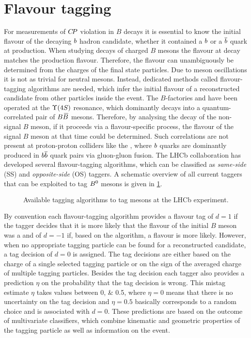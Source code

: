 
\section{Flavour tagging}
\label{sec:detector:tagging}

For measurements of ${C\!P}$ violation in $B$ decays it is essential to know the
initial flavour of the decaying ${b}$ hadron candidate, \ie whether it
contained a ${b}$ or a ${\overline {{b}}}$ quark at production. When studying
decays of charged $B$ mesons the flavour at decay matches the production
flavour. Therefore, the flavour can unambiguously be determined from the
charges of the final state particles. Due to meson oscillations it is not as
trivial for neutral mesons. Instead, dedicated methods called flavour-tagging
algorithms are needed, which infer the initial flavour of a reconstructed
candidate from other particles inside the event. The $B$-factories \babar and
\belle have been operated at the $\FourS$ resonance, which dominantly decays into a
quantum-correlated pair of $B{\kern 0.18em\overline{\kern -0.18em B}{}}$ mesons. Therefore, by analysing the decay
of the non-signal $B$ meson, \eg if it proceeds via a flavour-specific
process, the flavour of the signal $B$ meson at that time could be determined.
Such correlations are not present at proton-proton colliders like the \lhc,
where ${b}$ quarks are dominantly produced in ${{b}{\overline {{b}}}}$ quark pairs via
gluon-gluon fusion. The LHCb collaboration has developed several
flavour-tagging algorithms, which can be classified as \emph{same-side} (SS)
and \emph{opposite-side} (OS) taggers. A schematic overview of all current taggers
that can be exploited to tag ${{B}^0}$ mesons is given in
\cref{fig:detector:tagging:schematics}.
\begin{figure}[htb]
\centering

\caption{Available tagging algorithms to tag \Bz mesons at the LHCb experiment.}
\label{fig:detector:tagging:schematics}
\end{figure}
By convention each flavour-tagging algorithm provides a flavour tag of $d =
\num{+1}$ if the tagger decides that it is more likely that the flavour of the
initial $B$ meson was a \Bz and of $d = \num{-1}$ if, based on the algorithm,
a \Bzb flavour is more likely. However, when no appropriate tagging particle
can be found for a reconstructed candidate, a tag decision of $d = 0$ is
assigned. The tag decisions are either based on the charge of a single
selected tagging particle or on the sign of the averaged charge of multiple
tagging particles. Besides the tag decision each tagger also provides a
prediction $\eta$ on the probability that the tag decision is wrong. This
mistag estimate $\eta$ takes values between \numlist{0;0.5}, where $\eta =
0$ means that there is no uncertainty on the tag decision and $\eta = 0.5$
basically corresponds to a random choice and is associated with $d = 0$. These
predictions are based on the outcome of multivariate classifiers, which
combine kinematic and geometric properties of the tagging particle as well as
information on the event.

